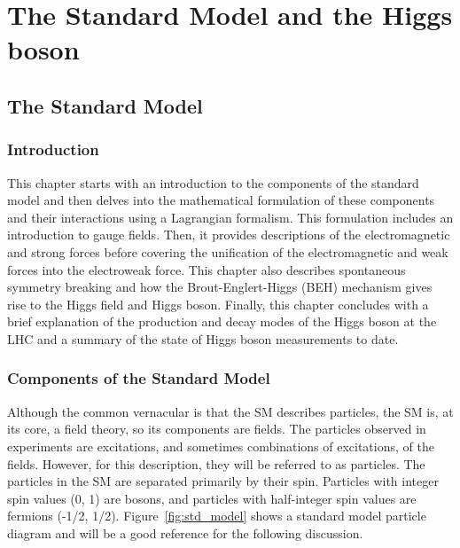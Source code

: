 \chapter{The Standard Model and the Higgs boson}
\label{chap:theory}

\section{The Standard Model}
\subsection{Introduction}
\label{sec:intro}

This chapter starts with an introduction to the components of the standard model and then delves into the mathematical formulation of these components and their interactions using a Lagrangian formalism. This formulation includes an introduction to gauge fields. Then, it provides descriptions of the electromagnetic and strong forces before covering the unification of the electromagnetic and weak forces into the electroweak force. This chapter also describes spontaneous symmetry breaking and how the Brout-Englert-Higgs (BEH) mechanism gives rise to the Higgs field and Higgs boson. Finally, this chapter concludes with a brief explanation of the production and decay modes of the Higgs boson at the LHC and a summary of the state of Higgs boson measurements to date.

\subsection{Components of the Standard Model}
\label{sec:particles_fields}

Although the common vernacular is that the SM describes particles, the SM is, at its core, a field theory, so its components are fields. The particles observed in experiments are excitations, and sometimes combinations of excitations, of the fields. However, for this description, they will be referred to as particles. The particles in the SM are separated primarily by their spin. Particles with integer spin values (0, 1) are bosons, and particles with half-integer spin values are fermions (-1/2, 1/2). Figure~\ref{fig:std_model} shows a standard model particle diagram and will be a good reference for the following discussion.

